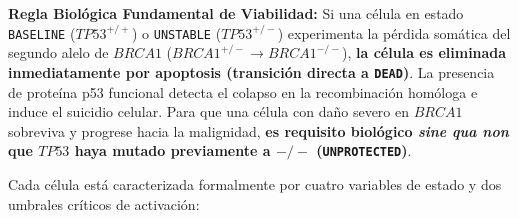 \documentclass[10pt,a4paper]{article}
\begin{document}
\vspace{0.5em}
\noindent\colorbox{red!8}{\parbox{\dimexpr\textwidth-2\fboxsep\relax}{
\small \textbf{\color{alertred} Regla Biológica Fundamental de Viabilidad:} Si una célula en estado \texttt{BASELINE} ($TP53^{+/+}$) o \texttt{UNSTABLE} ($TP53^{+/-}$) experimenta la pérdida somática del segundo alelo de $BRCA1$ ($BRCA1^{+/-} \to BRCA1^{-/-}$), \textbf{la célula es eliminada inmediatamente por apoptosis (transición directa a \texttt{DEAD})}. La presencia de proteína p53 funcional detecta el colapso en la recombinación homóloga e induce el suicidio celular. Para que una célula con daño severo en $BRCA1$ sobreviva y progrese hacia la malignidad, \textbf{es requisito biológico \textit{sine qua non} que $TP53$ haya mutado previamente a $-/-$ (\texttt{UNPROTECTED})}.
}}
\vspace{0.8em}

Cada célula está caracterizada formalmente por cuatro variables de estado y dos umbrales críticos de activación:
\end{document}
